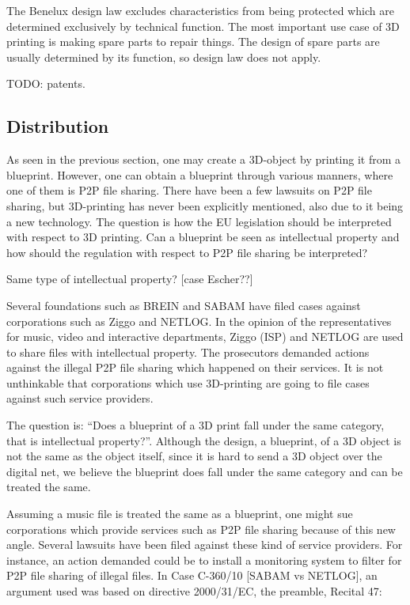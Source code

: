 The Benelux design law excludes characteristics from being protected which are determined exclusively by technical function.
The most important use case of 3D printing is making spare parts to repair things. The design of spare parts are usually determined by its function, so design law does not apply.

TODO: patents.


\subsection{Distribution}

As seen in the previous section, one may create a 3D-object by printing it from a blueprint. However, one can obtain a blueprint through various manners, where one of them is P2P file sharing. There have been a few lawsuits on P2P file sharing, but 3D-printing has never been explicitly mentioned, also due to it being a new technology. The question is how the EU legislation should be interpreted with respect to 3D printing. Can a blueprint be seen as intellectual property and how should the regulation with respect to P2P file sharing be interpreted?

Same type of intellectual property?
[case Escher??]

Several foundations such as BREIN and SABAM have filed cases against corporations such as Ziggo and NETLOG. In the opinion of the representatives for music, video and interactive departments, Ziggo (ISP) and NETLOG are used to share files with intellectual property. The prosecutors demanded actions against the illegal P2P file sharing which happened on their services. It is not unthinkable that corporations which use 3D-printing are going to file cases against such service providers.

The question is: “Does a blueprint of a 3D print fall under the same category, that is intellectual property?”. Although the design, a blueprint, of a 3D object is not the same as the object itself, since it is hard to send a 3D object over the digital net, we believe the blueprint does fall under the same category and can be treated the same.

Assuming a music file is treated the same as a blueprint, one might sue corporations which provide services such as P2P file sharing because of this new angle. Several lawsuits have been filed against these kind of service providers. For instance, an action demanded could be to install a monitoring system to filter for P2P file sharing of illegal files. In Case C-360/10 [SABAM vs NETLOG], an argument used was based on directive 2000/31/EC, the preamble, Recital 47: 

